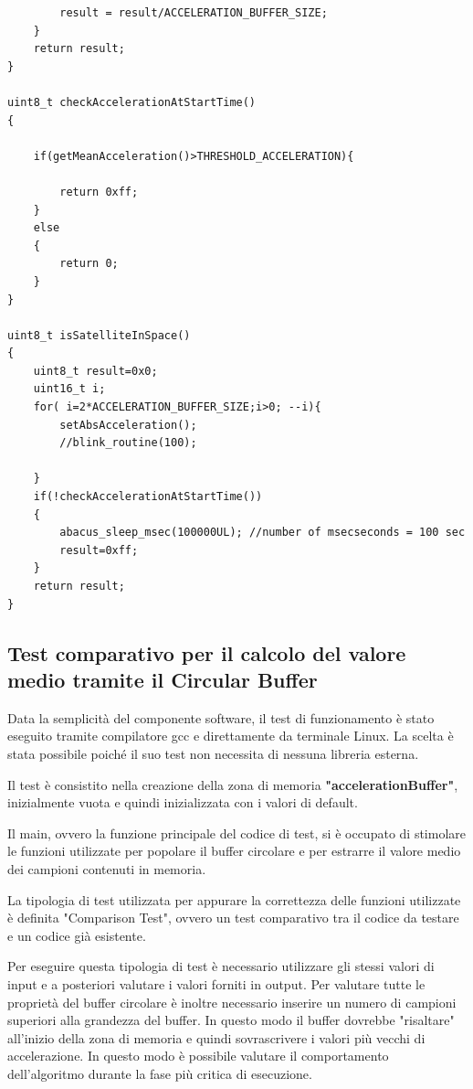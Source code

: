 \documentclass[LaM,binding=0.6cm,oneside]{../sapthesis}
\begin{document}
\begin{lstlisting}
        result = result/ACCELERATION_BUFFER_SIZE;
    }
    return result;
}

uint8_t checkAccelerationAtStartTime()
{

    if(getMeanAcceleration()>THRESHOLD_ACCELERATION){

        return 0xff;
    }
    else
    {
        return 0;
    }
}

uint8_t isSatelliteInSpace()
{
    uint8_t result=0x0;
    uint16_t i;
    for( i=2*ACCELERATION_BUFFER_SIZE;i>0; --i){
        setAbsAcceleration();
        //blink_routine(100);

    }
    if(!checkAccelerationAtStartTime())
    {
        abacus_sleep_msec(100000UL); //number of msecseconds = 100 sec
        result=0xff;
    }
    return result;
}

\end{lstlisting}
\subsection{Test comparativo per il calcolo del valore medio tramite il Circular Buffer}

Data la semplicità del componente software, il test di funzionamento è stato eseguito tramite compilatore gcc e direttamente da terminale Linux. La scelta è stata possibile poiché il suo test non necessita di nessuna libreria esterna.

Il test è consistito nella creazione della zona di memoria \textbf{"accelerationBuffer"}, inizialmente vuota e quindi inizializzata con i valori di default.

Il main, ovvero la funzione principale del codice di test, si è occupato di stimolare le funzioni utilizzate per popolare il buffer circolare e per estrarre il valore medio dei campioni contenuti in memoria.

La tipologia di test utilizzata per appurare la correttezza delle funzioni utilizzate è definita "Comparison Test", ovvero un test comparativo tra il codice da testare e un codice già esistente.

Per eseguire questa tipologia di test è necessario utilizzare gli stessi valori di input e a posteriori valutare i valori forniti in output. Per valutare tutte le proprietà del buffer circolare è inoltre necessario inserire un numero di campioni superiori alla grandezza del buffer. In questo modo il buffer dovrebbe "risaltare" all'inizio della zona di memoria e quindi sovrascrivere i valori più vecchi di accelerazione. In questo modo è possibile valutare il comportamento dell'algoritmo durante la fase più critica di esecuzione.
\end{document}
